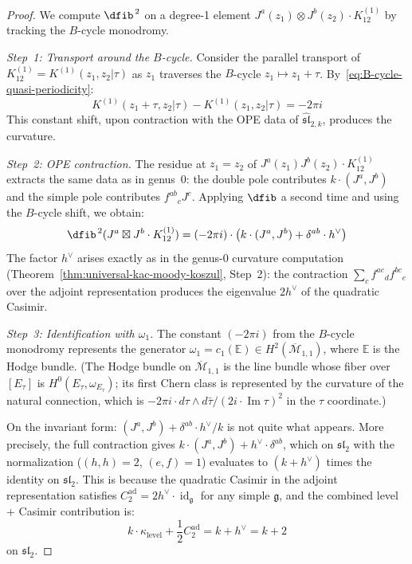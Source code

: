 \begin{proof}
We compute $\dfib^{\,2}$ on a degree-1 element $J^a(z_1) \otimes J^b(z_2) \cdot K^{(1)}_{12}$ by tracking the $B$-cycle monodromy.

\emph{Step~1: Transport around the $B$-cycle.}
Consider the parallel transport of $K^{(1)}_{12} = K^{(1)}(z_1,z_2|\tau)$ as $z_1$ traverses the $B$-cycle $z_1 \mapsto z_1 + \tau$.  By~\eqref{eq:B-cycle-quasi-periodicity}:
\begin{equation}
K^{(1)}(z_1+\tau,z_2|\tau) - K^{(1)}(z_1,z_2|\tau) = -2\pi i
\end{equation}
This constant shift, upon contraction with the OPE data of $\widehat{\mathfrak{sl}}_{2,k}$, produces the curvature.

\emph{Step~2: OPE contraction.}
The residue at $z_1 = z_2$ of $J^a(z_1) J^b(z_2) \cdot K^{(1)}_{12}$ extracts the same data as in genus~0: the double pole contributes $k \cdot (J^a, J^b)$ and the simple pole contributes $f^{ab}{}_c J^c$.  Applying $\dfib$ a second time and using the $B$-cycle shift, we obtain:
\begin{equation}
\dfib^{\,2}(J^a \boxtimes J^b \cdot K^{(1)}_{12}) = (-2\pi i) \cdot \bigl(k \cdot (J^a, J^b) + \delta^{ab} \cdot h^\vee\bigr)
\end{equation}
The factor $h^\vee$ arises exactly as in the genus-0 curvature computation (Theorem~\ref{thm:universal-kac-moody-koszul}, Step~2): the contraction $\sum_c f^{ac}{}_d f^{bc}{}_e$ over the adjoint representation produces the eigenvalue $2h^\vee$ of the quadratic Casimir.

\emph{Step~3: Identification with $\omega_1$.}
The constant $(-2\pi i)$ from the $B$-cycle monodromy represents the generator $\omega_1 = c_1(\mathbb{E}) \in H^2(\overline{\mathcal{M}}_{1,1})$, where $\mathbb{E}$ is the Hodge bundle.  (The Hodge bundle on $\overline{\mathcal{M}}_{1,1}$ is the line bundle whose fiber over $[E_\tau]$ is $H^0(E_\tau, \omega_{E_\tau})$; its first Chern class is represented by the curvature of the natural connection, which is $-2\pi i \cdot d\tau \wedge d\bar{\tau}/(2i \cdot \operatorname{Im}\tau)^2$ in the $\tau$ coordinate.)

On the invariant form: $(J^a, J^b) + \delta^{ab} \cdot h^\vee/k$ is not quite what appears.  More precisely, the full contraction gives $k \cdot (J^a, J^b) + h^\vee \cdot \delta^{ab}$, which on $\mathfrak{sl}_2$ with the normalization ($(h,h) = 2$, $(e,f)=1$) evaluates to $(k+h^\vee)$ times the identity on $\mathfrak{sl}_2$.  This is because the quadratic Casimir in the adjoint representation satisfies $C_2^{\mathrm{ad}} = 2h^\vee \cdot \operatorname{id}_{\mathfrak{g}}$ for any simple $\mathfrak{g}$, and the combined level + Casimir contribution is:
\begin{equation}
k \cdot \kappa_{\mathrm{level}} + \frac{1}{2}C_2^{\mathrm{ad}} = k + h^\vee = k + 2
\end{equation}
on $\mathfrak{sl}_2$.


\end{proof}

